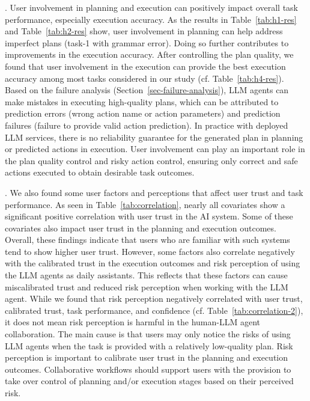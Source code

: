 . 
User involvement in planning and execution can positively impact overall task performance, especially execution accuracy. 
As the results in Table~\ref{tab:h1-res} and Table~\ref{tab:h2-res} show, user involvement in planning can help address imperfect plans (\eg task-1 with grammar error). Doing so further contributes to improvements in the execution accuracy. 
After controlling the plan quality, we found that user involvement in the execution can provide the best execution accuracy among most tasks considered in our study (cf. Table~\ref{tab:h4-res}). 
Based on the failure analysis (Section~\ref{sec-failure-analysis}), LLM agents can make mistakes in executing high-quality plans, which can be attributed to prediction errors (\ie wrong action name or action parameters) and prediction failures (\ie failure to provide valid action prediction). 
In practice with deployed LLM services, there is no reliability guarantee for the generated plan in planning or predicted actions in execution. 
User involvement can play an important role in the plan quality control and risky action control, ensuring  only correct and {safe} actions  executed to obtain desirable task outcomes. %

. %
We also found some user factors and perceptions that affect user trust and task performance. 
As seen in Table~\ref{tab:correlation}, nearly all covariates show a significant positive correlation with user trust in the AI system. 
Some of these covariates also impact user trust in the planning and execution outcomes. 
Overall, these findings indicate that users who are familiar with such systems tend to show higher user trust. 
However, some factors also correlate negatively with the calibrated trust in the execution outcomes and risk perception of using the LLM agents as daily assistants. 
This reflects that these factors can cause miscalibrated trust and reduced risk perception when working with the LLM agent. 
{While we found that risk perception negatively correlated with user trust, calibrated trust, task performance, and confidence (cf. Table~\ref{tab:correlation-2}), it does not mean risk perception is harmful in the human-LLM agent collaboration. 
The main cause is that users may only notice the risks of using LLM agents when the task is provided with a relatively low-quality plan.} 
Risk perception is important to calibrate user trust in the planning and execution outcomes. Collaborative workflows should support users with the provision to take over control of planning and/or execution stages based on their perceived risk.
 
